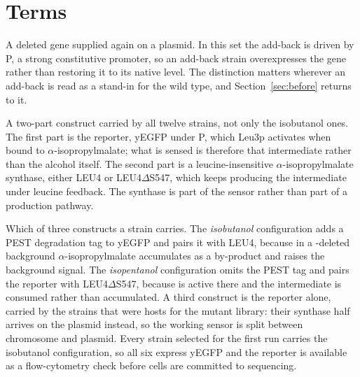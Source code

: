 
\section{Terms}\label{sec:terms}

\begin{description}[leftmargin=1.2em,itemsep=2pt,topsep=2pt]

\item[add-back] A deleted gene supplied again on a plasmid. In this set the
  add-back is driven by P, a strong constitutive promoter, so an
  add-back strain overexpresses the gene rather than restoring it to its native
  level. The distinction matters wherever an add-back is read as a stand-in for
  the wild type, and Section~\ref{sec:before} returns to it.

\item[biosensor] A two-part construct carried by all twelve strains, not only the
  isobutanol ones. The first part is the reporter, yEGFP under P,
  which Leu3p activates when bound to $\alpha$-isopropylmalate; what is sensed is
  therefore that intermediate rather than the alcohol itself. The second part is
  a leucine-insensitive $\alpha$-isopropylmalate synthase, either
  LEU4 or LEU4$\Delta$S547, which keeps producing the intermediate
  under leucine feedback. The synthase is part of the sensor rather than part of
  a production pathway.

\item[biosensor configuration] Which of three constructs a strain carries. The
  \emph{isobutanol} configuration adds a PEST degradation tag to yEGFP and pairs
  it with LEU4, because in a -deleted background
  $\alpha$-isopropylmalate accumulates as a by-product and raises the background
  signal. The \emph{isopentanol} configuration omits the PEST tag and pairs the
  reporter with LEU4$\Delta$S547, because  is active there and the
  intermediate is consumed rather than accumulated. A third construct is the
  reporter alone, carried by the strains that were hosts for the 
  mutant library: their synthase half arrives on the plasmid instead, so the
  working sensor is split between chromosome and plasmid. Every strain selected
  for the first run carries the isobutanol configuration, so all six express
  yEGFP and the reporter is available as a flow-cytometry check before cells are
  committed to sequencing.


\end{description}
